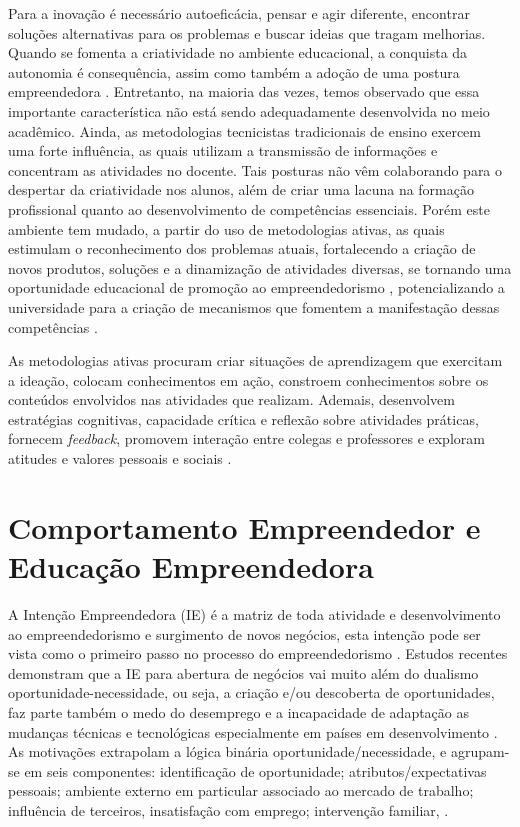 Para a inovação é necessário autoeficácia, pensar e agir diferente, encontrar soluções alternativas para os problemas e buscar ideias que tragam melhorias. Quando se fomenta a criatividade no ambiente educacional, a conquista da autonomia é consequência, assim como também a adoção de uma postura empreendedora \cite{gonzalez_predictors_2009}. Entretanto, na maioria das vezes, temos observado que essa importante característica não está sendo adequadamente desenvolvida no meio acadêmico. Ainda, as metodologias tecnicistas tradicionais de ensino exercem uma forte influência, as quais utilizam a transmissão de informações e concentram as atividades no docente. Tais posturas não vêm colaborando para o despertar da criatividade nos alunos, além de criar uma lacuna na formação profissional quanto ao desenvolvimento de competências essenciais. Porém este ambiente tem mudado, a partir do uso de metodologias ativas, as quais estimulam o reconhecimento dos problemas atuais, fortalecendo a criação de novos produtos, soluções e a dinamização de atividades diversas, se tornando uma oportunidade educacional de promoção ao empreendedorismo \cite{faria_promocao_2018}, potencializando a universidade para a criação de mecanismos que fomentem a manifestação dessas competências \cite{audy_innovation_2006}.

As metodologias ativas procuram criar situações de aprendizagem que exercitam a ideação, colocam conhecimentos em ação, constroem conhecimentos sobre os conteúdos envolvidos nas atividades que realizam. Ademais, desenvolvem estratégias cognitivas, capacidade crítica e reflexão sobre atividades práticas, fornecem \textit{feedback}, promovem interação entre colegas e professores e exploram atitudes e valores pessoais e sociais \cite{berbel_as_2011}. 

\section{Comportamento Empreendedor e Educação Empreendedora}

A Intenção Empreendedora (IE) é a matriz de toda atividade e desenvolvimento ao empreendedorismo e surgimento de novos negócios, esta intenção pode ser vista como o primeiro passo no processo do empreendedorismo \cite{zhao_relationship_2010, shirokova_exploring_2016}. Estudos recentes demonstram que a IE para abertura de negócios vai muito além do dualismo oportunidade-necessidade, ou seja, a criação e/ou descoberta de oportunidades, faz parte também o medo do desemprego e a incapacidade de adaptação as mudanças técnicas e tecnológicas especialmente em países em desenvolvimento \cite{vale_motivacoes_2014}. As motivações extrapolam a lógica binária oportunidade/necessidade, e agrupam-se em seis componentes: identificação de oportunidade; atributos/expectativas pessoais; ambiente externo em particular associado ao mercado de trabalho; influência de terceiros, insatisfação com emprego; intervenção familiar, \cite{vale_motivacoes_2014, rodrigues_intencao_2019,ferreira_intencao_2017}.


